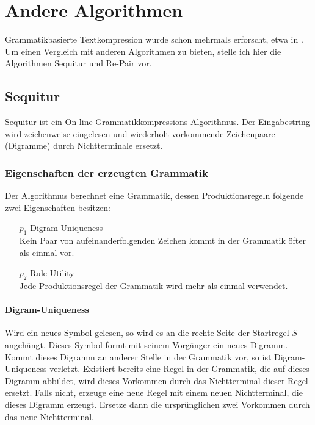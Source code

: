 \chapter{Andere Algorithmen}

Grammatikbasierte Textkompression wurde schon mehrmals erforscht, etwa in \cite{nevill-manning_identifying_1997, larsson_offline_1999, apostolico_off-line_2000}. Um einen Vergleich mit anderen Algorithmen zu bieten, stelle ich hier die Algorithmen Sequitur\cite{nevill-manning_identifying_1997} und Re-Pair\cite{larsson_offline_1999} vor.

\section{Sequitur}

Sequitur\cite{nevill-manning_identifying_1997} ist ein On-line Grammatikkompressions-Algorithmus. Der Eingabestring wird zeichenweise eingelesen und wiederholt vorkommende Zeichenpaare (Digramme) durch Nichtterminale ersetzt.

\subsection{Eigenschaften der erzeugten Grammatik}

Der Algorithmus berechnet eine Grammatik, dessen Produktionsregeln folgende zwei Eigenschaften besitzen:
\begin{enumerate}
	\item[$p_1$] Digram-Uniqueness\\
	Kein Paar von aufeinanderfolgenden Zeichen kommt in der Grammatik öfter als einmal vor.
	\item[$p_2$] Rule-Utility\\
	Jede Produktionsregel der Grammatik wird mehr als einmal verwendet.
\end{enumerate}

\subsubsection{Digram-Uniqueness}

Wird ein neues Symbol gelesen, so wird es an die rechte Seite der Startregel $S$ angehängt. Dieses Symbol formt mit seinem Vorgänger ein neues Digramm. Kommt dieses Digramm an anderer Stelle in der Grammatik vor, so ist Digram-Uniqueness verletzt. 
Existiert bereits eine Regel in der Grammatik, die auf dieses Digramm abbildet, wird dieses Vorkommen durch das Nichtterminal dieser Regel ersetzt. 
Falls nicht, erzeuge eine neue Regel mit einem neuen Nichtterminal, die dieses Digramm erzeugt. Ersetze dann die ursprünglichen zwei Vorkommen durch das neue Nichtterminal.

